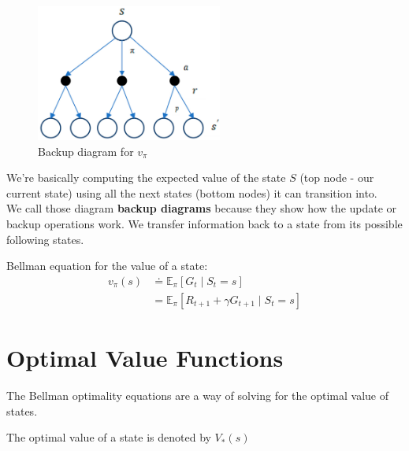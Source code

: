 \begin{table}[H]
    \begin{minipage}{0.45\linewidth}
        \begin{figure}[H]
            \centering
            \includegraphics[height=4.5cm]{Pictures/deep-reinforcement-learning/drl-backup-diagram_v-pi.jpg}
            \caption{Backup diagram for $v_\pi$}
        \end{figure}
    \end{minipage}
    \hfill
    \begin{minipage}{0.45\linewidth}
        We’re basically computing the expected value of the state $S$ (top node - our current state) using all the next states (bottom nodes) it can transition into.\\
        We call those diagram \textbf{backup diagrams} because they show how the update or backup operations work. We transfer information back to a state from its possible following states.
    \end{minipage}
\end{table}

Bellman equation for the value of a state:
\begin{align}
    v_\pi(s) &\doteq \mathbb{E}_\pi [G_t \mid S_t = s] \\
    &= \mathbb{E}_\pi [R_{t+1} + \gamma G_{t+1} \mid S_t = s]
\end{align}

\section{Optimal Value Functions \cite{medium-introduction-to-reinforcement-learning-rl-part-3-finite-markov-decision-processes-51e1f8d3ddb7}}

The Bellman optimality equations are a way of solving for the optimal value of states.


The optimal value of a state is denoted by $V_*(s)$



